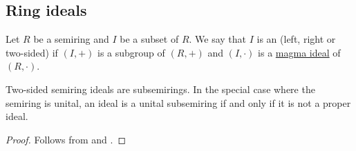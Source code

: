 \subsection{Ring ideals}\label{subsec:ring_ideals}

\begin{Definition}\label{def:semiring_ideal}
  Let \( R \) be a semiring and \( I \) be a subset of \( R \). We say that \( I \) is an  (left, right or two-sided) if \( (I, +) \) is a subgroup of \( (R, +) \) and \( (I, \cdot) \) is a \hyperref[def:magma_ideal]{magma ideal} of \( (R, \cdot) \).
\end{Definition}

\begin{Proposition}\label{thm:semiring_ideal_is_nonunital_subsemiring}
  Two-sided semiring ideals are subsemirings. In the special case where the semiring is unital, an ideal is a unital subsemiring if and only if it is not a proper ideal.
\end{Proposition}
\begin{proof}
  Follows from  and .
\end{proof}

